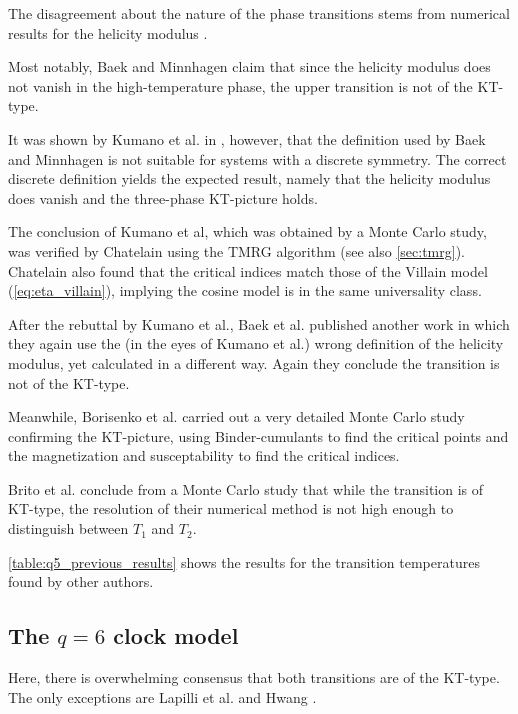 The disagreement about the nature of the phase transitions
stems from numerical results for the helicity modulus
\cite{fisher1973helicity}.

Most notably, Baek and Minnhagen \cite{baek2010non} claim that since the helicity modulus does
not vanish in the high-temperature phase, the upper transition is not of the KT-type.

It was shown by Kumano et al.
in \cite{kumano2013response}, however, that the definition used by Baek and Minnhagen is not suitable for systems with a
discrete symmetry.
The correct discrete definition yields the expected result, namely that the helicity modulus does vanish and the
three-phase KT-picture holds.

The conclusion of Kumano et al, which was obtained by a Monte Carlo study,
was verified by Chatelain \cite{chatelain2014dmrg} using the TMRG algorithm \cite{nishino1995density} (see also
\autoref{sec:tmrg}).
Chatelain also found that the critical indices match those of the Villain model (\autoref{eq:eta_villain}),
implying the cosine model is in the same universality class.

After the rebuttal by Kumano et al., Baek et al.
published another work \cite{baek2013residual} in which they again use the (in the eyes of Kumano et al.) wrong
definition of the helicity modulus, yet calculated in a different way.
Again they conclude the transition is not of the KT-type.

Meanwhile, Borisenko et al.
\cite{borisenko2011numerical} carried out a very detailed Monte Carlo study confirming the KT-picture,
using Binder-cumulants to find the critical points and the magnetization and susceptability to find the critical
indices.

Brito et al.
\cite{brito2010twodimensional} conclude from a Monte Carlo study that while the transition is of KT-type,
the resolution of their numerical method is not high enough to distinguish between $T_1$ and $T_2$.

\autoref{table:q5_previous_results} shows the results for the transition temperatures found by other authors.

\subsection{The $q = 6$ clock model}

Here, there is overwhelming consensus that both transitions are of the KT-type.
The only exceptions are Lapilli et al. \cite{lapilli2006universality} and Hwang \cite{hwang2009six}.

